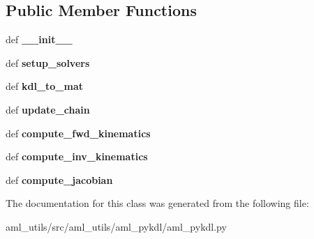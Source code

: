 \subsection*{Public Member Functions}
\begin{DoxyCompactItemize}
\item 
\hypertarget{classaml__utils_1_1aml__pykdl_1_1aml__pykdl_1_1_a_m_l_py_k_d_l_a6f12e39e44bc0853e061650c621fd0f0}{def {\bfseries \-\_\-\-\_\-init\-\_\-\-\_\-}}\label{classaml__utils_1_1aml__pykdl_1_1aml__pykdl_1_1_a_m_l_py_k_d_l_a6f12e39e44bc0853e061650c621fd0f0}

\item 
\hypertarget{classaml__utils_1_1aml__pykdl_1_1aml__pykdl_1_1_a_m_l_py_k_d_l_a42c4440e4732a9c99b476fea8ce821a3}{def {\bfseries setup\-\_\-solvers}}\label{classaml__utils_1_1aml__pykdl_1_1aml__pykdl_1_1_a_m_l_py_k_d_l_a42c4440e4732a9c99b476fea8ce821a3}

\item 
\hypertarget{classaml__utils_1_1aml__pykdl_1_1aml__pykdl_1_1_a_m_l_py_k_d_l_a392f6469e3345380d62f0a33c91ca2f5}{def {\bfseries kdl\-\_\-to\-\_\-mat}}\label{classaml__utils_1_1aml__pykdl_1_1aml__pykdl_1_1_a_m_l_py_k_d_l_a392f6469e3345380d62f0a33c91ca2f5}

\item 
\hypertarget{classaml__utils_1_1aml__pykdl_1_1aml__pykdl_1_1_a_m_l_py_k_d_l_a66395f551e56f2f5afb5db24523496c7}{def {\bfseries update\-\_\-chain}}\label{classaml__utils_1_1aml__pykdl_1_1aml__pykdl_1_1_a_m_l_py_k_d_l_a66395f551e56f2f5afb5db24523496c7}

\item 
\hypertarget{classaml__utils_1_1aml__pykdl_1_1aml__pykdl_1_1_a_m_l_py_k_d_l_aa18c5e950aa8f73dbadd60ef964bce9f}{def {\bfseries compute\-\_\-fwd\-\_\-kinematics}}\label{classaml__utils_1_1aml__pykdl_1_1aml__pykdl_1_1_a_m_l_py_k_d_l_aa18c5e950aa8f73dbadd60ef964bce9f}

\item 
\hypertarget{classaml__utils_1_1aml__pykdl_1_1aml__pykdl_1_1_a_m_l_py_k_d_l_a3c4800765edd6817627e09a57b6faeda}{def {\bfseries compute\-\_\-inv\-\_\-kinematics}}\label{classaml__utils_1_1aml__pykdl_1_1aml__pykdl_1_1_a_m_l_py_k_d_l_a3c4800765edd6817627e09a57b6faeda}

\item 
\hypertarget{classaml__utils_1_1aml__pykdl_1_1aml__pykdl_1_1_a_m_l_py_k_d_l_aa31bf2c5db8fefd500d5b52c5094d5dd}{def {\bfseries compute\-\_\-jacobian}}\label{classaml__utils_1_1aml__pykdl_1_1aml__pykdl_1_1_a_m_l_py_k_d_l_aa31bf2c5db8fefd500d5b52c5094d5dd}

\end{DoxyCompactItemize}


The documentation for this class was generated from the following file\-:\begin{DoxyCompactItemize}
\item 
aml\-\_\-utils/src/aml\-\_\-utils/aml\-\_\-pykdl/aml\-\_\-pykdl.\-py\end{DoxyCompactItemize}
